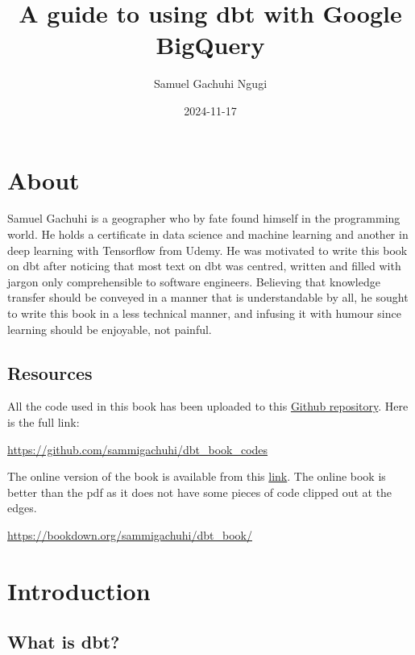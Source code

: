 \documentclass[
]{book}
\title{A guide to using dbt with Google BigQuery}
\author{Samuel Gachuhi Ngugi}
\date{2024-11-17}
\begin{document}
\maketitle

{
\setcounter{tocdepth}{1}
\tableofcontents
}
\hypertarget{about}{%
\chapter{About}\label{about}}

Samuel Gachuhi is a geographer who by fate found himself in the programming world. He holds a certificate in data science and machine learning and another in deep learning with Tensorflow from Udemy. He was motivated to write this book on dbt after noticing that most text on dbt was centred, written and filled with jargon only comprehensible to software engineers. Believing that knowledge transfer should be conveyed in a manner that is understandable by all, he sought to write this book in a less technical manner, and infusing it with humour since learning should be enjoyable, not painful.

\hypertarget{resources}{%
\section{Resources}\label{resources}}

All the code used in this book has been uploaded to this \href{https://github.com/sammigachuhi/dbt_book_codes}{Github repository}. Here is the full link:

\url{https://github.com/sammigachuhi/dbt_book_codes}

The online version of the book is available from this \href{https://bookdown.org/sammigachuhi/dbt_book/}{link}. The online book is better than the pdf as it does not have some pieces of code clipped out at the edges.

\url{https://bookdown.org/sammigachuhi/dbt_book/}

\hypertarget{introduction}{%
\chapter{Introduction}\label{introduction}}

\hypertarget{what-is-dbt}{%
\section{What is dbt?}\label{what-is-dbt}}
\end{document}
